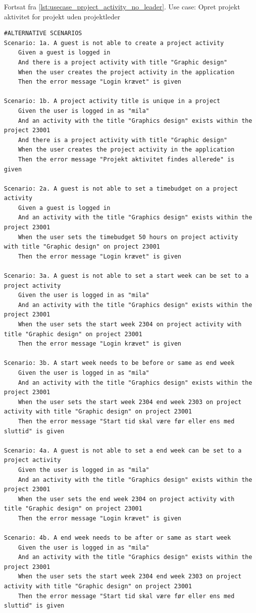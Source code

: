 \begin{listing}[H]
    \centering
    \caption{Fortsat fra \cref{lst:usecase_project_activity_no_leader}. Use case: Opret projekt aktivitet for projekt uden projektleder} \label{lst:usecase_project_activity_no_leader_2}
    \begin{verbatim}
#ALTERNATIVE SCENARIOS
Scenario: 1a. A guest is not able to create a project activity
    Given a guest is logged in
    And there is a project activity with title "Graphic design"  
    When the user creates the project activity in the application 
    Then the error message "Login krævet" is given

Scenario: 1b. A project activity title is unique in a project
    Given the user is logged in as "mila"
    And an activity with the title "Graphics design" exists within the project 23001
    And there is a project activity with title "Graphic design"  
    When the user creates the project activity in the application 
    Then the error message "Projekt aktivitet findes allerede" is given

Scenario: 2a. A guest is not able to set a timebudget on a project activity
    Given a guest is logged in
    And an activity with the title "Graphics design" exists within the project 23001
    When the user sets the timebudget 50 hours on project activity with title "Graphic design" on project 23001
    Then the error message "Login krævet" is given

Scenario: 3a. A guest is not able to set a start week can be set to a project activity
    Given the user is logged in as "mila"
    And an activity with the title "Graphics design" exists within the project 23001
    When the user sets the start week 2304 on project activity with title "Graphic design" on project 23001
    Then the error message "Login krævet" is given

Scenario: 3b. A start week needs to be before or same as end week
    Given the user is logged in as "mila"
    And an activity with the title "Graphics design" exists within the project 23001
    When the user sets the start week 2304 end week 2303 on project activity with title "Graphic design" on project 23001
    Then the error message "Start tid skal være før eller ens med sluttid" is given

Scenario: 4a. A guest is not able to set a end week can be set to a project activity
    Given the user is logged in as "mila"
    And an activity with the title "Graphics design" exists within the project 23001
    When the user sets the end week 2304 on project activity with title "Graphic design" on project 23001
    Then the error message "Login krævet" is given

Scenario: 4b. A end week needs to be after or same as start week
    Given the user is logged in as "mila"
    And an activity with the title "Graphics design" exists within the project 23001
    When the user sets the start week 2304 end week 2303 on project activity with title "Graphic design" on project 23001
    Then the error message "Start tid skal være før eller ens med sluttid" is given
    \end{verbatim}
\end{listing}\newpage
